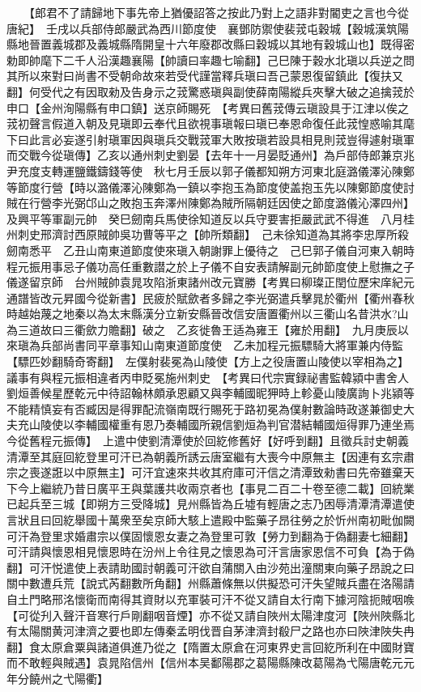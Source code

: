 　　【郎君不了請歸地下事先帝上猶優詔答之按此乃對上之語非對閽吏之言也今從唐紀】　壬戌以兵部侍郎嚴武為西川節度使　襄鄧防禦使裴茙屯穀城【穀城漢筑陽縣地晉置義城郡及義城縣隋開皇十六年廢郡改縣曰穀城以其地有穀城山也】既得密勅即帥麾下二千人沿漢趣襄陽【帥讀曰率趣七喻翻】己巳陳于穀水北瑱以兵逆之問其所以來對曰尚書不受朝命故來若受代謹當釋兵瑱曰吾己蒙恩復留鎮此【復扶又翻】何受代之有因取勑及告身示之茙驚惑瑱與副使薛南陽縱兵夾擊大破之追擒茙於申口【金州洵陽縣有申口鎮】送京師賜死　【考異曰舊茙傳云瑱設具于江津以俟之茙初聲言假道入朝及見瑱即云奉代且欲視事瑱報曰瑱已奉恩命復任此茙惶惑喻其麾下曰此言必妄遂引射瑱軍因與瑱兵交戰茙軍大敗按瑱若設具相見則茙豈得遽射瑱軍而交戰今從瑱傳】乙亥以通州刺史劉晏【去年十一月晏貶通州】為戶部侍郎兼京兆尹充度支轉運鹽鐵鑄錢等使　秋七月壬辰以郭子儀都知朔方河東北庭潞儀澤沁陳鄭等節度行營【時以潞儀澤沁陳鄭為一鎮以李抱玉為節度使盖抱玉先以陳鄭節度使討賊在行營李光弼邙山之敗抱玉奔澤州陳鄭為賊所隔朝廷因使之節度潞儀沁澤四州】及興平等軍副元帥　癸巳劒南兵馬使徐知道反以兵守要害拒嚴武武不得進　八月桂州刺史邢濟討西原賊帥吳功曹等平之【帥所類翻】　己未徐知道為其將李忠厚所殺劒南悉平　乙丑山南東道節度使來瑱入朝謝罪上優待之　己巳郭子儀自河東入朝時程元振用事忌子儀功高任重數譛之於上子儀不自安表請解副元帥節度使上慰撫之子儀遂留京師　台州賊帥袁晁攻陷浙東諸州改元寶勝【考異曰柳璨正閏位歷宋庠紀元通譜皆改元昇國今從新書】民疲於賦歛者多歸之李光弼遣兵擊晁於衢州【衢州春秋時越始蔑之地秦以為太末縣漢分立新安縣晉改信安唐置衢州以三衢山名昔洪水?山為三道故曰三衢歛力贍翻】破之　乙亥徙魯王适為雍王【雍於用翻】　九月庚辰以來瑱為兵部尚書同平章事知山南東道節度使　乙未加程元振驃騎大將軍兼内侍監【驃匹妙翻騎奇寄翻】　左僕射裴冕為山陵使【方上之役唐置山陵使以宰相為之】議事有與程元振相違者丙申貶冕施州刺史　【考異曰代宗實録祕書監韓潁中書舍人劉烜善候星歷乾元中待詔翰林頗承恩顧又與李輔國昵狎時上軫憂山陵廣詢卜兆潁等不能精慎妄有否臧因是得罪配流嶺南既行賜死于路初冕為僕射數論時政遂兼御史大夫充山陵使以李輔國權重有恩乃奏輔國所親信劉烜為判官潜結輔國烜得罪乃連坐焉今從舊程元振傳】　上遣中使劉清潭使於回紇修舊好【好呼到翻】且徵兵討史朝義清潭至其庭回紇登里可汗已為朝義所誘云唐室繼有大喪今中原無主【因連有玄宗肅宗之喪遂誑以中原無主】可汗宜速來共收其府庫可汗信之清潭致勑書曰先帝雖棄天下今上繼統乃昔日廣平王與葉護共收兩京者也【事見二百二十卷至德二載】回統業已起兵至三城【即朔方三受降城】見州縣皆為丘墟有輕唐之志乃困辱清潭清潭遣使言狀且曰回紇舉國十萬衆至矣京師大駭上遣殿中監藥子昂往勞之於忻州南初毗伽闕可汗為登里求婚肅宗以僕固懷恩女妻之為登里可敦【勞力到翻為于偽翻妻七細翻】可汗請與懷恩相見懷恩時在汾州上令往見之懷恩為可汗言唐家恩信不可負【為于偽翻】可汗悦遣使上表請助國討朝義可汗欲自蒲關入由沙苑出潼關東向藥子昂說之曰關中數遭兵荒【說式芮翻數所角翻】州縣蕭條無以供擬恐可汗失望賊兵盡在洛陽請自土門略邢洺懷衛而南得其資財以充軍裝可汗不從又請自太行南下據河陰扼賊咽㗋【可從刋入聲汗音寒行戶剛翻咽音煙】亦不從又請自陜州太陽津度河【陜州陜縣北有太陽關黄河津濟之要也即左傳秦孟明伐晋自茅津濟封殽尸之路也亦曰陜津陜失冉翻】食太原倉粟與諸道俱進乃從之【隋置太原倉在河東界史言回紇所利在中國財寶而不敢輕與賊遇】袁晁陷信州【信州本吴鄱陽郡之葛陽縣陳改葛陽為弋陽唐乾元元年分饒州之弋陽衢】

